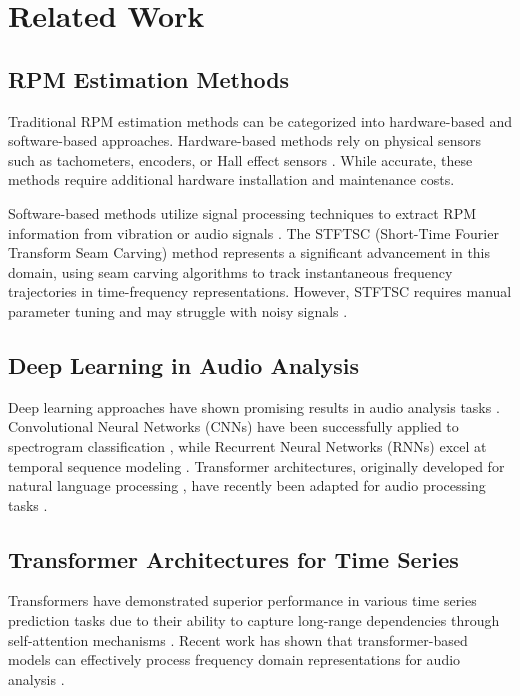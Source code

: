 \documentclass[journal,10pt]{IEEEtran}
\begin{document}
\section{Related Work}

\subsection{RPM Estimation Methods}

Traditional RPM estimation methods can be categorized into hardware-based and software-based approaches. Hardware-based methods rely on physical sensors such as tachometers, encoders, or Hall effect sensors \cite{measurement}. While accurate, these methods require additional hardware installation and maintenance costs.

Software-based methods utilize signal processing techniques to extract RPM information from vibration or audio signals \cite{non3, non1, non4}. The STFTSC (Short-Time Fourier Transform Seam Carving) method \cite{wu2022instantaneous} represents a significant advancement in this domain, using seam carving algorithms to track instantaneous frequency trajectories in time-frequency representations. However, STFTSC requires manual parameter tuning and may struggle with noisy signals \cite{non5}.

\subsection{Deep Learning in Audio Analysis}

Deep learning approaches have shown promising results in audio analysis tasks \cite{biotech}. Convolutional Neural Networks (CNNs) have been successfully applied to spectrogram classification \cite{NN}, while Recurrent Neural Networks (RNNs) excel at temporal sequence modeling \cite{RNN1}. Transformer architectures, originally developed for natural language processing \cite{transformer}, have recently been adapted for audio processing tasks \cite{audio_transformer}.

\subsection{Transformer Architectures for Time Series}

Transformers have demonstrated superior performance in various time series prediction tasks due to their ability to capture long-range dependencies through self-attention mechanisms \cite{transformer}. Recent work has shown that transformer-based models can effectively process frequency domain representations for audio analysis \cite{audio_transformer, GAN1}.
\end{document}
